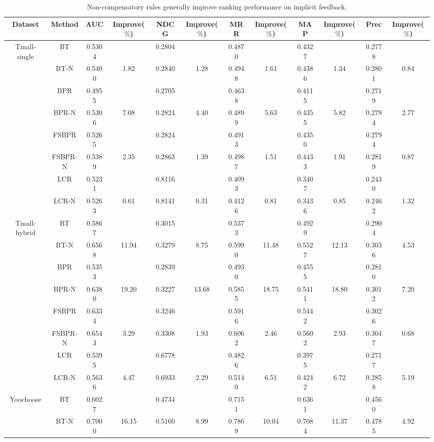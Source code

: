 \documentclass[letterpaper]{article} %
\begin{document}
\begin{table}[ht]
\caption{Non-compensatory rules generally improve ranking performance on implicit feedback.}
\scriptsize
\begin{center}
\begin{tabular}{c|c |cc |cc |cc|cc|cc}
\hline
Dataset	& Method	& AUC	& Improve($\%$)&	NDCG&	Improve($\%$)&	MRR	&Improve($\%$) &	MAP&	Improve($\%$)&	Prec	&Improve($\%$)\\\hline
\multirow{6}{*}{Tmall-single} &BT	&0.5304 	&	&0.2804 	&	&0.4870 	&	&0.4327 	&	&0.2778 &\\
&BT-N	&0.5400 	&1.82	&0.2840 	&1.28	&0.4948 	&1.61	&0.4386 	&1.34	&0.2801 & 0.84\\
&BPR	&0.4955 	&	&0.2705 	&	&0.4638 	&	&0.4115 	&	&0.2719& \\
&BPR-N	&0.5306 	&7.08	&0.2824 	&4.40	&0.4899 	&5.63	&0.4355 	&5.82	&0.2794 & 2.77 \\
&FSBPR	&0.5265 	&	&0.2824 	&	&0.4913 	&	&0.4350 	&	&0.2794& \\
&FSBPR-N	&0.5389 	&2.35	&0.2863 	&1.39	&0.4987 	&1.51	&0.4433 	&1.91	&0.2819 & 0.87 \\
&LCR &0.5231 & &0.8116  && 0.4093 & &0.3407 & & 0.2430  &\\ 
&LCR-N &0.5263  &0.61 & 0.8141 &0.31 &0.4126 &0.81 &0.3436 & 0.85 &0.2462  &1.32\\
\hline
\multirow{6}{*}{Tmall-hybrid} & BT	&0.5867 	&	&0.3015 	&	&0.5373 	&	&0.4929 	&	&0.2904 & \\
&BT-N	&0.6568 	&11.94	&0.3279 	&8.75	&0.5990 	&11.48	&0.5527 	&12.13	&0.3036 &4.53 \\
&BPR	&0.5353 	&	&0.2839 	&	&0.4930 	&	&0.4555 	&	&0.2810& \\
&BPR-N	&0.6380 	&19.20	&0.3227 	&13.68	&0.5855 	&18.75	&0.5411 	&18.80	&0.3012 &7.20 \\
&FSBPR	&0.6334 	&	&0.3246 	&	&0.5916 	&	&0.5442 	&	&0.3026& \\
&FSBPR-N	&0.6543 	&3.29	&0.3308 	&1.93	&0.6062 	&2.46	&0.5602 	&2.93	&0.3047&0.68 \\
&LCR &0.5395& &0.6778 && 0.4826& &0.3975& & 0.2717 &\\ 
&LCR-N &0.5636 &4.47 & 0.6933 &2.29 &0.5140 &6.51 &0.4242 & 6.72 &0.2858  &5.19\\
\hline
\multirow{6}{*}{Yoochoose} &BT	&0.6027 	&	&0.4734 	&	&0.7151 	&	&0.6361 	&	&0.4560 & \\
&BT-N	&0.7000 	&16.15	&0.5160 	&8.99	&0.7869 	&10.04	&0.7084 	&11.37	&0.4785  &4.92\\

\end{tabular}
\end{center}
\end{table}
\end{document}
